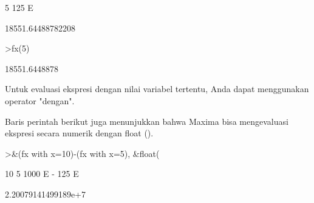 \documentclass[12pt,Times new roman,letterpaper]{book}
\begin{document}
\begin{eulernootebook}
\begin{eulercomment}
\begin{eulercomment}
\begin{eulernootebook}
\begin{eulercomment}
\begin{eulercomment}
\begin{euleroutput}
                                       5
                                  125 E
  
  
                            18551.64488782208
  
\end{euleroutput}
\begin{eulerprompt}
>fx(5)
\end{eulerprompt}
\begin{euleroutput}
  18551.6448878
\end{euleroutput}
\begin{eulercomment}
Untuk evaluasi ekspresi dengan nilai variabel tertentu, Anda dapat
menggunakan operator "dengan".

Baris perintah berikut juga menunjukkan bahwa Maxima bisa mengevaluasi
ekspresi secara numerik dengan float ().
\end{eulercomment}
\begin{eulerprompt}
>&(fx with x=10)-(fx with x=5), &float(%
\end{eulerprompt}
\begin{euleroutput}
  
                                  10        5
                            1000 E   - 125 E
  
  
                           2.20079141499189e+7
  

\end{euleroutput}
\end{eulercomment}
\end{eulercomment}
\end{eulernootebook}
\end{eulercomment}
\end{eulercomment}
\end{eulernootebook}
\end{document}
